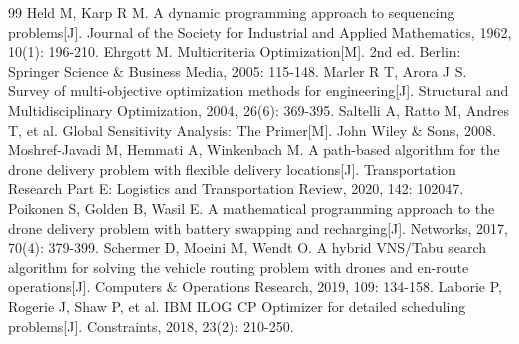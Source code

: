 \documentclass[withoutpreface,bwprint]{format}
\begin{document}
\begin{thebibliography}{99}
 Held M, Karp R M. A dynamic programming approach to sequencing problems[J]. Journal of the Society for Industrial and Applied Mathematics, 1962, 10(1): 196-210.
 Ehrgott M. Multicriteria Optimization[M]. 2nd ed. Berlin: Springer Science \& Business Media, 2005: 115-148.
 Marler R T, Arora J S. Survey of multi-objective optimization methods for engineering[J]. Structural and Multidisciplinary Optimization, 2004, 26(6): 369-395.
 Saltelli A, Ratto M, Andres T, et al. Global Sensitivity Analysis: The Primer[M]. John Wiley \& Sons, 2008.
 Moshref-Javadi M, Hemmati A, Winkenbach M. A path-based algorithm for the drone delivery problem with flexible delivery locations[J]. Transportation Research Part E: Logistics and Transportation Review, 2020, 142: 102047.
 Poikonen S, Golden B, Wasil E. A mathematical programming approach to the drone delivery problem with battery swapping and recharging[J]. Networks, 2017, 70(4): 379-399.
 Schermer D, Moeini M, Wendt O. A hybrid VNS/Tabu search algorithm for solving the vehicle routing problem with drones and en-route operations[J]. Computers \& Operations Research, 2019, 109: 134-158.
 Laborie P, Rogerie J, Shaw P, et al. IBM ILOG CP Optimizer for detailed scheduling problems[J]. Constraints, 2018, 23(2): 210-250.
\end{thebibliography}
\end{document}
